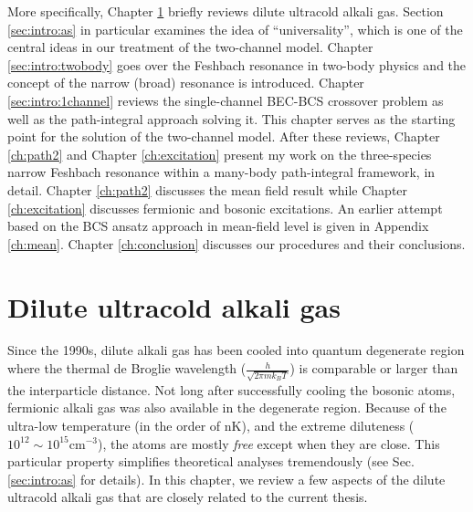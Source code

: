 More specifically, Chapter \ref{sec:intro:one} briefly reviews  dilute ultracold alkali gas.   Section \ref{sec:intro:as} in particular examines the idea of ``universality'', which is one of the central ideas in our treatment of the two-channel model.  Chapter \ref{sec:intro:twobody} goes over the Feshbach resonance in two-body physics and  the concept of  the narrow (broad) resonance is introduced. Chapter \ref{sec:intro:1channel} reviews the single-channel BEC-BCS crossover problem as well as the path-integral approach solving it. This chapter serves as the starting point for the solution of the two-channel model. After these reviews,   Chapter \ref{ch:path2} and Chapter \ref{ch:excitation} present my work on the three-species narrow Feshbach resonance within a many-body path-integral framework, in detail.   Chapter \ref{ch:path2} discusses the mean field result while Chapter \ref{ch:excitation} discusses fermionic and bosonic excitations. An earlier attempt   based on the BCS ansatz  approach in mean-field level is given in Appendix \ref{ch:mean}.  Chapter \ref{ch:conclusion} discusses our procedures and their conclusions.  

\chapter{Dilute ultracold alkali gas}\label{sec:intro:one}
  Since the 1990s, dilute  alkali gas has been cooled into quantum degenerate region where the thermal de Broglie wavelength ($\frac{h}{\sqrt{2\pi{m}k_{B}{T}}}$) is comparable or larger than the interparticle distance.  Not long after successfully cooling the bosonic atoms, fermionic alkali gas was also available in the degenerate region.  Because of the ultra-low temperature (in the order of nK), and the extreme diluteness ($10^{12}\sim10^{15}\text{cm}^{-3}$), the atoms are mostly \emph{free} except when they are  close.   This particular property simplifies theoretical analyses tremendously (see Sec. \ref{sec:intro:as} for details).  In this chapter, we review a few aspects of the dilute ultracold alkali gas that are closely related to the current thesis.     

